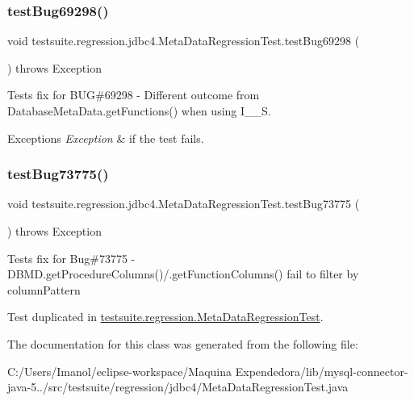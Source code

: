 \subsubsection{\texorpdfstring{test\+Bug69298()}{testBug69298()}}
{\footnotesize\ttfamily void testsuite.\+regression.\+jdbc4.\+Meta\+Data\+Regression\+Test.\+test\+Bug69298 (\begin{DoxyParamCaption}{ }\end{DoxyParamCaption}) throws Exception}

Tests fix for B\+UG\#69298 -\/ Different outcome from Database\+Meta\+Data.\+get\+Functions() when using I\+\_\+\+\_\+S.


\begin{DoxyExceptions}{Exceptions}
{\em Exception} & if the test fails. \\
\hline
\end{DoxyExceptions}
\mbox{\label{classtestsuite_1_1regression_1_1jdbc4_1_1_meta_data_regression_test_aa5290e6cea1c9e297a48fe48a53c2b49}} 
\subsubsection{\texorpdfstring{test\+Bug73775()}{testBug73775()}}
{\footnotesize\ttfamily void testsuite.\+regression.\+jdbc4.\+Meta\+Data\+Regression\+Test.\+test\+Bug73775 (\begin{DoxyParamCaption}{ }\end{DoxyParamCaption}) throws Exception}

Tests fix for Bug\#73775 -\/ D\+B\+M\+D.\+get\+Procedure\+Columns()/.get\+Function\+Columns() fail to filter by column\+Pattern

Test duplicated in \mbox{\hyperlink{classtestsuite_1_1regression_1_1_meta_data_regression_test}{testsuite.\+regression.\+Meta\+Data\+Regression\+Test}}. 

The documentation for this class was generated from the following file\+:\begin{DoxyCompactItemize}
\item 
C\+:/\+Users/\+Imanol/eclipse-\/workspace/\+Maquina Expendedora/lib/mysql-\/connector-\/java-\/5../src/testsuite/regression/jdbc4/Meta\+Data\+Regression\+Test.\+java\end{DoxyCompactItemize}
